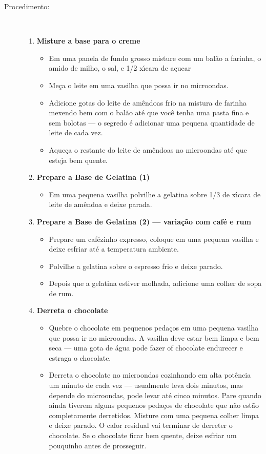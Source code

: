 \documentclass [11pt, letterpaper] {article}
\begin{document}
\begin{description}
\item[Procedimento:]\ \\
	\begin{enumerate}
	\item {\bf Misture a base para o creme}
		\begin{itemize}
		\item Em uma panela de fundo grosso misture com um bal\~ao a farinha, o amido de milho, o sal, e 1/2 x\'{\i}cara de a\c{c}ucar 
		\item Me\c{c}a o leite em uma vasilha que possa ir no microondas.
		\item Adicione gotas do leite de am\^endoas frio na mistura de farinha mexendo bem com o bal\~ao at\'e que voc\^e tenha uma pasta fina e sem bolotas --- o segredo \'e adicionar uma pequena quantidade de leite de cada vez.
		\item Aque\c{c}a o restante do leite de am\^endoas no microondas at\'e que esteja bem quente.
		\end{itemize}

	\item {\bf Prepare a Base de Gelatina (1)}
		\begin{itemize}
		\item Em uma pequena vasilha polvilhe a gelatina sobre 1/3 de x\'{\i}cara de leite de am\^endoa e deixe parada.
		\end{itemize}
	\item {\bf Prepare a Base de Gelatina (2) --- varia\c{c}\~ao com caf\'e e rum}
		\begin{itemize}
		\item Prepare um caf\'ezinho expresso, coloque em uma pequena vasilha e deixe esfriar at\'e a temperatura ambiente.
		\item Polvilhe a gelatina sobre o espresso frio e deixe parado.
		\item Depois que a gelatina estiver molhada, adicione uma colher de sopa de rum.
		\end{itemize}

	\item {\bf Derreta o chocolate}
		\begin{itemize}
		\item Quebre o chocolate em pequenos peda\c{c}os em uma pequena vasilha que possa ir no microondas. A vasilha deve estar bem limpa e bem seca --- uma gota de \'agua pode fazer of chocolate endurecer e estraga o chocolate.
		\item Derreta o chocolate no microondas cozinhando em alta pot\^encia um minuto de cada vez --- usualmente leva dois minutos, mas depende do microondas, pode levar at\'e cinco minutos. Pare quando ainda tiverem alguns pequenos peda\c{c}os de chocolate que n\~ao est\~ao completamente derretidos. Misture com uma pequena colher limpa e deixe parado. O calor residual vai terminar de derreter o chocolate. Se o chocolate ficar bem quente, deixe esfriar um pouquinho antes de prosseguir.
		\end{itemize}
		

\end{enumerate}
\end{description}
\end{document}
